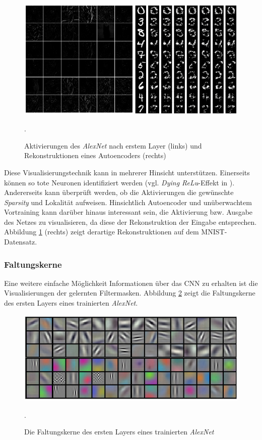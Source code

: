 \begin{figure}
\centering
\includegraphics[width=0.6\linewidth]{images/4_output}
\caption[]{Aktivierungen des \textit{AlexNet} nach erstem Layer (links)  \cite[siehe][]{Kaparthy2014} und Rekonstruktionen eines Autoencoders (rechts) \cite[siehe][]{Vincent2010}}.
\label{fig:4_output}
\end{figure}

Diese Visualisierungstechnik kann in mehrerer Hinsicht unterstützen. Einerseits können so tote Neuronen identifiziert werden (vgl. \textit{Dying ReLu}-Effekt in \cite{Maas2013}). Andererseits kann überprüft werden, ob die Aktivierungen die gewünschte \textit{Sparsity} und Lokalität aufweisen.
Hinsichtlich Autoencoder und unüberwachtem Vortraining kann darüber hinaus interessant sein, die Aktivierung bzw. Ausgabe des Netzes zu visualisieren, da diese der Rekonstruktion der Eingabe entsprechen. Abbildung \ref{fig:4_output} (rechts) zeigt derartige Rekonstruktionen auf dem MNIST-Datensatz.

\subsubsection{Faltungskerne}

Eine weitere einfache Möglichkeit Informationen über das CNN zu erhalten ist die Visualisierungen der gelernten Filtermasken. Abbildung \ref{fig:4_kernel} zeigt die Faltungskerne des ersten Layers eines trainierten \textit{AlexNet}. 

\begin{figure}[H]
\centering
\includegraphics[width=0.5\linewidth]{images/4_kernel}
\caption[]{Die Faltungskerne des ersten Layers eines trainierten \textit{AlexNet}  \cite[siehe][]{Krizhevsky2012}}.
\label{fig:4_kernel}
\end{figure}


